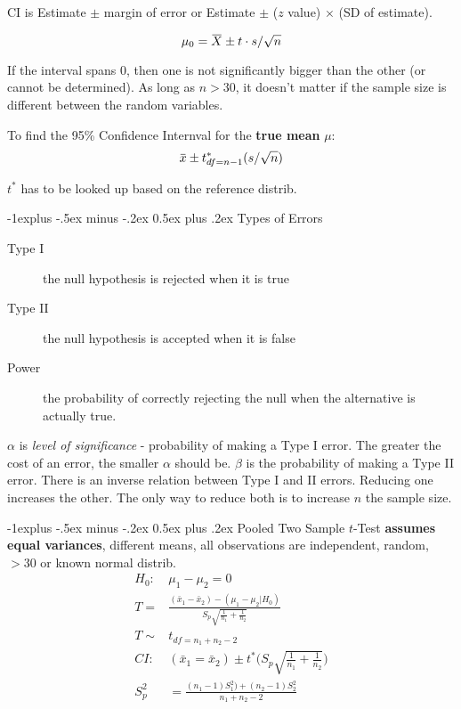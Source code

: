 \documentclass[10pt,landscape]{article}
\makeatletter
\renewcommand{\subsection}{\@startsection{subsection}{2}{0mm}%
                                {-1explus -.5ex minus -.2ex}%
                                {0.5ex plus .2ex}%
                                {\normalfont\normalsize\bfseries}}
\newcommand{\overbar}[1]{\mkern 1.5mu\overline{\mkern-1.5mu#1\mkern-1.5mu}\mkern 1.5mu}
\makeatother
\begin{document}
\begin{multicols*}{3}
CI is Estimate $\pm$ margin of error or Estimate $\pm$ ($z$ value) $\times$ (SD of estimate).

\[
\mu_0 = \overbar{X} \pm t\cdot s/\sqrt{n}
\]

If the interval spans 0, then one is not significantly bigger than the other (or cannot be determined). 
As long as $n > 30$, it doesn't matter if the sample size is different between the random variables.

To find the 95\% Confidence Internval for the \textbf{true mean} $\mu$:
\[
\overbar{x} \pm t^*_{df=n-1} (s/\sqrt{n})
\]

$t^*$ has to be looked up based on the reference distrib.



\subsection{Types of Errors}
\begin{description}
\item[Type I]the null hypothesis is rejected when it is true
\item[Type II] the null hypothesis is accepted when it is false
\item[Power] the probability of correctly rejecting the null when the alternative is actually true.
\end{description}
$\alpha$ is \textit{level of significance} - probability of making a Type I error. The greater the cost of an error, the smaller $\alpha$ should be.
$\beta$ is the probability of making a Type II error. There is an inverse relation between Type I and II errors. Reducing one increases the other. The only way to reduce both is to increase $n$ the sample size.

\subsection{Pooled Two Sample $t$-Test}
\textbf{assumes equal variances}, different means, all observations are independent, random, $> 30$ or known normal distrib. 
\begin{align*}
H_0 :& \mu_1 - \mu_2 = 0 \\
T =& \frac{(\bar{x}_1 - \bar{x}_2) - (\mu_1 - \mu_2 | H_0) } {S_p \sqrt{\frac{1}{n_1} + \frac{1}{n_2}  } } \\
T  \sim& t_{df = n_1 + n_2 - 2} \\
CI: & (\bar{x}_1 = \bar{x}_2) \pm t^* \bigg(S_p \sqrt{\frac{1}{n_1} + \frac{1}{n_2}     }   \bigg) \\
S_p^2 &= \frac {(n_1 - 1)S_1^2) + (n_2 - 1)S^2_2  } { n_1 + n_2 -2 } \\
\end{align*}


\end{multicols*}
\end{document}
